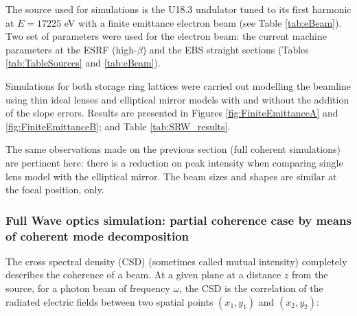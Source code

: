 \documentclass{iucr}              %
\begin{document}
The source used for simulations is the U18.3 undulator tuned to its first harmonic at $E=17225$ eV with a finite emittance electron beam (see Table \ref{tab:eBeam}). Two set of parameters were used for the electron beam: the current machine parameters at the ESRF (high-$\beta$) and the EBS straight sections (Tables \ref{tab:TableSources} and \ref{tab:eBeam}). 

Simulations for both storage ring lattices were carried out modelling the beamline using thin ideal lenses and elliptical mirror models with and without the addition of the slope errors. Results are presented in Figures \ref{fig:FiniteEmittanceA} and \ref{fig:FiniteEmittanceB}; and Table \ref{tab:SRW_results}.

The same observations made on the previous section (full coherent simulations) are pertinent here: there is a reduction on peak intensity when comparing single lens model with the elliptical mirror. The beam sizes and shapes are similar at the focal position, only.

% 


% 
% 
%  
\subsubsection{Full Wave optics simulation: partial coherence case by means of coherent mode decomposition}
\label{comsyl}
% 

The cross spectral density (CSD) (sometimes called mutual intensity) completely describes the coherence of a beam. 
At a given plane at a distance $z$ from the source, for a photon beam of frequency $\omega$, the CSD is the correlation of the radiated electric fields between two spatial points $(x_1,y_1)$ and $(x_2,y_2)$:
\end{document}
